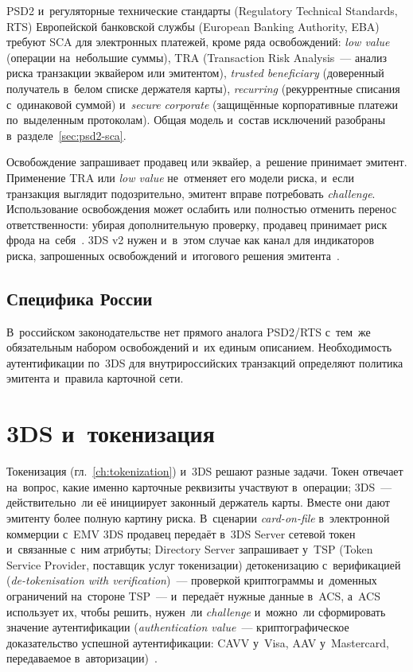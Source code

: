 PSD2 и~регуляторные технические стандарты (Regulatory Technical Standards, RTS)
Европейской банковской службы (European Banking Authority,
EBA)~\cite{eba-rts-sca} требуют SCA для электронных платежей, кроме ряда
освобождений: \textit{low value} (операции на~небольшие суммы), TRA (Transaction Risk
Analysis~--- анализ риска транзакции эквайером или эмитентом), \textit{trusted
beneficiary} (доверенный получатель в~белом списке держателя карты), \textit{recurring}
(рекуррентные списания с~одинаковой суммой) и~\textit{secure corporate} (защищённые
корпоративные платежи по~выделенным протоколам). Общая модель и~состав
исключений разобраны в~разделе~\ref{sec:psd2-sca}.

Освобождение запрашивает продавец или эквайер, а~решение принимает эмитент.
Применение TRA или \textit{low value} не~отменяет его модели риска, и~если
транзакция выглядит подозрительно, эмитент вправе потребовать \textit{challenge}.
Использование освобождения может ослабить или полностью отменить перенос
ответственности: убирая дополнительную проверку, продавец принимает риск фрода
на~себя~\cite{eba-rts-sca}. 3DS v2 нужен и~в~этом случае как канал для
индикаторов риска, запрошенных освобождений и~итогового решения
эмитента~\cite{eba-rts-sca}.

\subsection*{Специфика России}

В~российском законодательстве нет прямого аналога PSD2/RTS с~тем~же
обязательным набором освобождений и~их единым описанием. Необходимость
аутентификации по~3DS для внутрироссийских транзакций определяют политика
эмитента и~правила карточной сети.

\section{3DS и~токенизация}\label{sec:3ds-tokenization}

Токенизация (гл.~\ref{ch:tokenization}) и~3DS решают разные задачи. Токен
отвечает на~вопрос, какие именно карточные реквизиты участвуют в~операции;
3DS~--- действительно~ли её инициирует законный держатель карты. Вместе они
дают эмитенту более полную картину риска. В~сценарии \textit{card-on-file}
в~электронной коммерции с~EMV 3DS продавец передаёт в~3DS Server сетевой токен и~связанные
с~ним атрибуты; Directory Server запрашивает у~TSP (Token Service Provider,
поставщик услуг токенизации) детокенизацию с~верификацией (\textit{de-tokenisation with verification})~--- проверкой криптограммы и~доменных
ограничений на~стороне TSP~--- и~передаёт нужные данные в~ACS, а~ACS использует
их, чтобы решить, нужен~ли \textit{challenge} и~можно~ли сформировать значение аутентификации (\textit{authentication
  value}~--- криптографическое доказательство успешной аутентификации: CAVV
  у~Visa, AAV у~Mastercard, передаваемое
в~авторизации)~\cite{emvco-payment-tokenisation-guide}.

